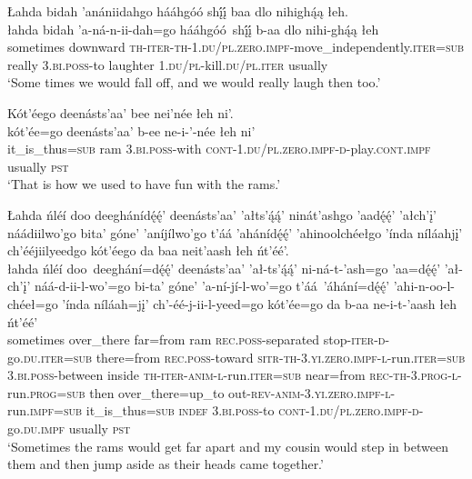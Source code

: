\ea\label{ex:text6-6-5}
Łahda bidah ’anániidahgo hááhgóó shį́į́ baa dlo nihighą́ą łeh.\\
\gll łahda	bidah	’a-ná-n-ii-dah=go	hááhgóó~{shį́į́}	b-aa	dlo	nihi-ghą́ą	łeh\\
     sometimes	downward	\textsc{th}-\textsc{iter}-\textsc{th}-1.\textsc{du}/\textsc{pl}.\textsc{zero}.\textsc{impf}-move\_independently.\textsc{iter}=\textsc{sub}	really	3.\textsc{bi}.\textsc{poss}-to	laughter	1.\textsc{du}/\textsc{pl}-kill.\textsc{du}/\textsc{pl}.\textsc{iter}	usually\\
\glt `Some times we would fall off, and we would really laugh then too.'
\z

\ea\label{ex:text6-6-6}
Kót’éego deenásts’aa’ bee nei’née łeh ni’.\\
\gll kót’ée=go	deenásts’aa’	b-ee	ne-i-’-née	łeh	ni’\\
     it\_is\_thus=\textsc{sub}	ram	3.\textsc{bi}.\textsc{poss}-with	\textsc{cont}-1.\textsc{du}/\textsc{pl}.\textsc{zero}.\textsc{impf}-\textsc{d}-play.\textsc{cont}.\textsc{impf}	usually	\textsc{pst}\\
\glt `That is how we used to have fun with the rams.'
\z

\ea\label{ex:text6-6-7}
Łahda ńléí doo deeghánídę́ę́’ deenásts’aa’ ’ałts’ą́ą́’ ninát’ashgo ’aadę́ę́’ ’ałch’į’ náádiilwo’go bita’ góne’ ’aníjílwo’go t’áá ’ahánídę́ę́’ ’ahinoolchéełgo ’índa níláahjį’ ch’ééjiilyeedgo kót’éego da baa neit’aash łeh ńt’éé’.\\
\gll łahda	ńléí	doo~{deeghání=dę́ę́’}	deenásts’aa’	’ał-ts’ą́ą́’	ni-ná-t-’ash=go	’aa=dę́ę́’	’ał-ch’į’	náá-d-ii-l-wo’=go	bi-ta’	góne’	’a-ní-jí-l-wo’=go	t’áá~{’áhání=dę́ę́’}	’ahi-n-oo-l-chéeł=go	’índa	níláah=jį’	ch’-éé-j-ii-l-yeed=go	kót’ée=go	da	b-aa	ne-i-t-’aash	łeh	ńt’éé’\\
     sometimes	over\_there	far=from	ram	\textsc{rec}.\textsc{poss}-separated	stop-\textsc{iter}-\textsc{d}-go.\textsc{du}.\textsc{iter}=\textsc{sub}	there=from	\textsc{rec}.\textsc{poss}-toward	\textsc{sitr}-\textsc{th}-3.\textsc{yi}.\textsc{zero}.\textsc{impf}-\textsc{l}-run.\textsc{iter}=\textsc{sub}	3.\textsc{bi}.\textsc{poss}-between	inside	\textsc{th}-\textsc{iter}-\textsc{anim}-\textsc{l}-run.\textsc{iter}=\textsc{sub}	near=from	\textsc{rec}-\textsc{th}-3.\textsc{prog}-\textsc{l}-run.\textsc{prog}=\textsc{sub}	then	over\_there=up\_to	out-\textsc{rev}-\textsc{anim}-3.\textsc{yi}.\textsc{zero}.\textsc{impf}-\textsc{l}-run.\textsc{impf}=\textsc{sub}	it\_is\_thus=\textsc{sub}	\textsc{indef}	3.\textsc{bi}.\textsc{poss}-to	\textsc{cont}-1.\textsc{du}/\textsc{pl}.\textsc{zero}.\textsc{impf}-\textsc{d}-go.\textsc{du}.\textsc{impf}	usually	\textsc{pst}\\
\glt `Sometimes the rams would get far apart and my cousin would step in between them and then jump aside as their heads came together.'
\z

